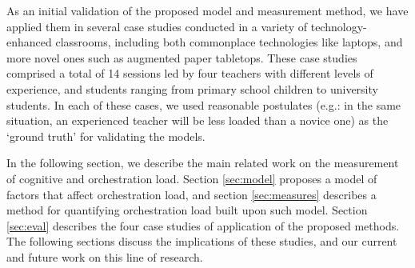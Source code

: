 \documentclass[10pt,journal,compsoc]{IEEEtran}
\begin{document}
As an initial validation of the proposed model and measurement method, we have applied them in several case studies conducted in a variety of technology-enhanced classrooms, including both commonplace technologies like laptops, and more novel ones such as augmented paper tabletops. These case studies comprised a total of 14 sessions led by four teachers with different levels of experience, and students ranging from primary school children to university students. In each of these cases, we used reasonable postulates (e.g.: in the same situation, an experienced teacher will be less loaded than a novice one) as the `ground truth' for validating the models.

In the following section, we describe the main related work on the measurement of cognitive and orchestration load. Section \ref{sec:model} proposes a model of factors that affect orchestration load, and section \ref{sec:measures} describes a method for quantifying orchestration load built upon such model. Section \ref{sec:eval} describes the four case studies of application of the proposed methods. The following sections discuss the implications of these studies, and our current and future work on this line of research.
\end{document}

